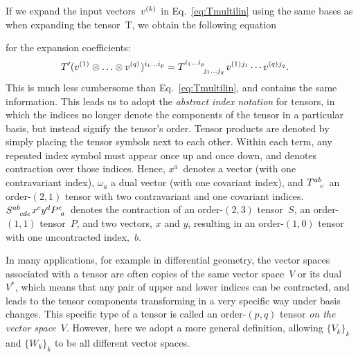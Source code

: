 If we expand the input vectors~$v\spidx{k}{}{}$ in
Eq.~\eqref{eq:Tmultilin} using the same bases as when expanding the tensor~T,
we obtain the following equation

for the expansion coefficients:
\begin{align}
T'(v\spidx{1}{}{} \otimes \ldots \otimes v\spidx{q}{}{})\indices{^{i_1 \ldots i_p}}
&=
T\indices{^{i_1 \ldots i_p}_{j_1 \ldots j_q}}
v\spidx{1}{j_1}{}
\cdots
v\spidx{q}{j_q}{}.
\end{align}
This is much less cumbersome than Eq.~\eqref{eq:Tmultilin}, and
contains the same information.
This leads us to adopt the \emph{abstract index notation} for tensors,
in which the indices no longer denote the components of the tensor in a
particular basis, but instead signify the tensor's order.
Tensor products are denoted by simply placing the tensor symbols next to each other.
Within each term, any repeated index symbol must appear once up and once down, and denotes
contraction over those indices.
Hence, $x^a$~denotes a vector (with one contravariant index),
$\omega_a$ a dual vector (with one covariant index),
and $T\indices{^{ab}_c}$ an order-$(2,1)$ tensor with two
contravariant and one covariant indices.
$S\indices{^{ab}_{cde}} x^c y^d P\indices{^e_a}$ denotes the contraction of
an order-$(2,3)$ tensor~$S$,
an order-$(1,1)$ tensor~$P$,
and two vectors, $x$ and $y$, resulting in an order-$(1,0)$ tensor
with one uncontracted index,~$b$.


In many applications, for example in differential geometry, the vector spaces
associated with a tensor are often copies of the same vector space~$V$
or its dual~$V^*$,
which means that any pair of upper and lower indices can be contracted,
and leads to the tensor components transforming
in a very specific way under basis changes.
This specific type of a tensor is called an
order-$(p,q)$ tensor \textit{on the vector space}~$V$.
However, here we adopt a more general definition, allowing $\{V_k\}_k$ and
$\{W_k\}_k$ to be all different vector spaces.
